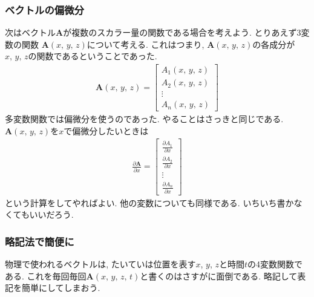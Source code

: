 \subsubsection{ベクトルの偏微分}
次はベクトル$\bm{A}$が複数のスカラー量の関数である場合を考えよう. とりあえず3変数の関数
$\bm{A}(x, \, y, \, z)$について考える. 
これはつまり, $\bm{A}(x, \, y, \, z)$の各成分が$x, \, y, \, z$の関数であるということであった. 
\renewcommand{\arraystretch}{1}
\begin{eqnarray}
\bm{A}(x, \, y, \, z) = \left[
\begin{array}{c}
 A_1 (x, \, y, \, z) \\
 A_2 (x, \, y, \, z) \\
 \vdots \\
 A_n (x, \, y, \, z)
 \end{array}
\right]
\label{eq:vecxyz}
\end{eqnarray}
多変数関数では偏微分を使うのであった. やることはさっきと同じである. 
$\bm{A}(x, \, y, \, z)$を$x$で偏微分したいときは
\renewcommand{\arraystretch}{2}
\begin{eqnarray}
\frac{\partial \bm{A}}{\partial x} = \left[
\begin{array}{c}
\displaystyle 
\frac{\partial A_1}{\partial x} \\
\displaystyle
\frac{\partial A_2}{\partial x} \\
\vdots \\
\displaystyle
\frac{\partial A_n}{\partial x} 
\end{array}
\right]
\label{eq:vecxhenbibun}
\end{eqnarray}
という計算をしてやればよい. 他の変数についても同様である. いちいち書かなくてもいいだろう. 
\subsubsection{略記法で簡便に}
物理で使われるベクトルは, たいていは位置を表す$x$, $y$, $z$と時間$t$の4変数関数である. 
これを毎回毎回$\bm{A}(x, \, y, \, z, \, t)$と書くのはさすがに面倒である. 略記して表記を簡単にしてしまおう. 


